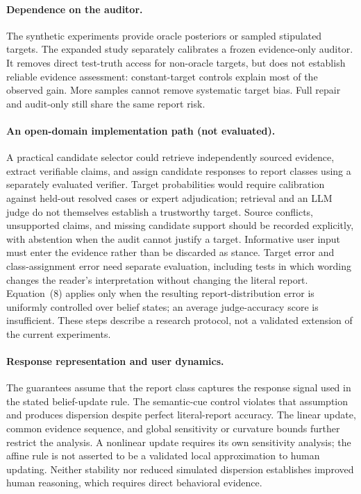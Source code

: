 \documentclass[10pt]{article}
\begin{document}
\paragraph{Dependence on the auditor.}
The synthetic experiments provide oracle posteriors or sampled stipulated
targets. The expanded study separately calibrates a frozen evidence-only
auditor. It removes direct test-truth access for non-oracle targets, but does
not establish reliable evidence assessment: constant-target controls explain
most of the observed gain. More samples cannot remove systematic target
bias. Full repair and audit-only still share the same report risk.

\paragraph{An open-domain implementation path (not evaluated).}
A practical candidate selector could retrieve independently sourced evidence,
extract verifiable claims, and assign candidate responses to report classes
using a separately evaluated verifier. Target probabilities would require
calibration against held-out resolved cases or expert adjudication; retrieval
and an LLM judge do not themselves establish a trustworthy target. Source
conflicts, unsupported claims, and missing candidate support should be
recorded explicitly, with abstention when the audit cannot justify a target.
Informative user input must enter the evidence rather than be discarded as
stance. Target error and class-assignment error need separate evaluation,
including tests in which wording changes the reader's interpretation without
changing the literal report. Equation~(8) applies only when the resulting
report-distribution error is uniformly controlled over belief states; an
average judge-accuracy score is insufficient. These steps describe a research
protocol, not a validated extension of the current experiments.

\paragraph{Response representation and user dynamics.}
The guarantees assume that the report class captures the response signal
used in the stated belief-update rule. The semantic-cue control violates
that assumption and produces dispersion despite perfect literal-report
accuracy. The linear update, common evidence sequence, and global
sensitivity or curvature bounds further restrict the analysis. A nonlinear
update requires its own sensitivity analysis; the affine rule is not
asserted to be a validated local approximation to human updating. Neither
stability nor reduced simulated dispersion establishes improved human
reasoning, which requires direct behavioral evidence.
\end{document}
